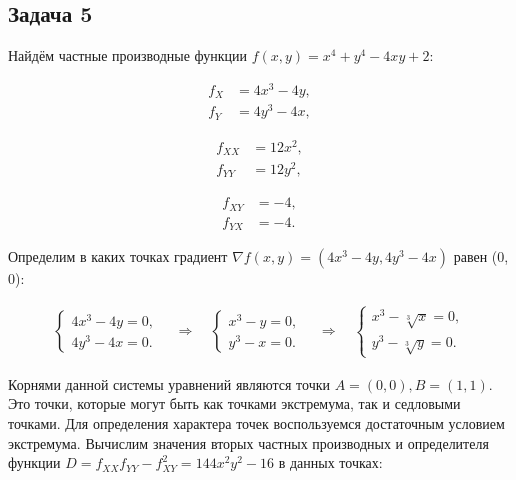 \documentclass[a4paper,11pt]{article}
\begin{document}
\subsection{Задача 5}

Найдём частные производные функции $f(x,y) = x^4 + y^4 -4xy + 2$:

\begin{minipage}{0.4\linewidth}  
\begin{align*}
f_X & = 4x^3 -4y, \\
f_Y & = 4y^3 -4x,
\end{align*}
\end{minipage}  
\begin{minipage}{0.3\linewidth}  
\begin{align*}
f_{XX} & = 12x^2, \\
f_{YY} & = 12y^2,
\end{align*}
\end{minipage}
\begin{minipage}{0.3\linewidth}
\begin{align*}
f_{XY} & = -4, \\
f_{YX} & = -4.
\end{align*}
\end{minipage}

\vspace{1em}

Определим в каких точках градиент $\nabla f(x, y) = (4x^3-4y, 4y^3 -4x)$ равен (0, 0):

\begin{align*}
\begin{cases*}
4x^3 - 4y = 0,\\
4y^3 - 4x = 0.
\end{cases*}
\quad \Rightarrow \quad 
\begin{cases*}
x^3 - y = 0,\\
y^3 - x = 0.
\end{cases*}
\quad \Rightarrow \quad 
\begin{cases*}
x^3 - \sqrt[3]{x} = 0,\\
y^3 - \sqrt[3]{y} = 0.
\end{cases*}
\end{align*}

Корнями данной системы уравнений являются точки $A = (0, 0), B = (1, 1)$. Это точки, которые могут быть как точками экстремума, так и седловыми точками. Для определения характера точек воспользуемся достаточным условием экстремума. Вычислим значения вторых частных производных и определителя функции $D = f_{XX}f_{YY}-f_{XY}^2 = 144x^2y^2 - 16$ в данных точках:
\end{document}
